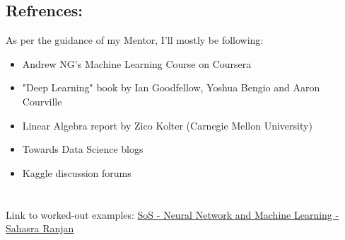 \subsection*{Refrences:}
	As per the guidance of my Mentor, I'll mostly be following:
	\begin{itemize}
		\item Andrew NG's Machine Learning Course on Coursera
		\item "Deep Learning" book by Ian Goodfellow, Yoshua Bengio and Aaron Courville 
		\item Linear Algebra report by Zico Kolter (Carnegie Mellon University)
		\item Towards Data Science blogs
		\item Kaggle discussion forums
	\end{itemize}

\section*{}
Link to worked-out examples: \href{https://github.com/sahasra-01/SoS}{SoS - Neural Network and Machine Learning - Sahasra Ranjan}


